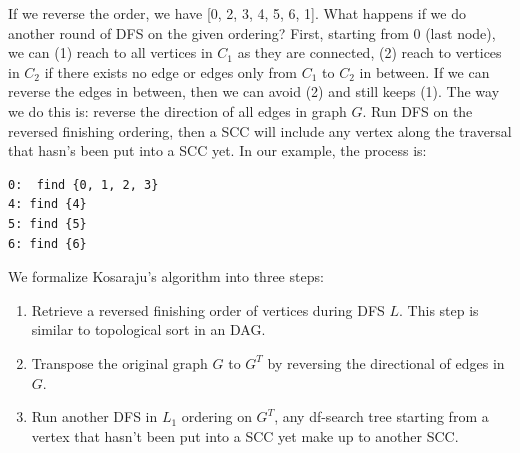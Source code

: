 \documentclass[../main.tex]{subfiles}
\begin{document}
If we reverse the order, we have [0, 2, 3, 4, 5, 6, 1]. What happens if we do another round of DFS on the given ordering? First, starting from 0 (last node), we can (1) reach to all vertices in $C_1$ as they are connected, (2) reach to vertices in $C_2$ if there exists no edge or edges only from $C_1$ to $C_2$ in between. If we can reverse the edges in between, then we can avoid (2) and still keeps (1). The way we do this is: reverse the direction of all edges in graph $G$. Run DFS on the reversed finishing ordering, then a SCC will include any vertex along the traversal that hasn's been put into a SCC yet. In our example, the process is:
\begin{lstlisting}[numbers=none]
0:  find {0, 1, 2, 3}
4: find {4}
5: find {5}
6: find {6}
\end{lstlisting}
We formalize Kosaraju's algorithm into three steps: 
\begin{enumerate}
\item Retrieve a reversed finishing order of vertices during DFS $L$. This step is similar to topological sort in an DAG.
\item Transpose the original graph $G$ to $G^T$ by reversing the directional of edges in $G$.
\item Run another DFS in $L_1$ ordering on $G^T$, any df-search tree starting from a vertex that hasn't been put into a SCC yet make up to another SCC. 
\end{enumerate}
\end{document}

